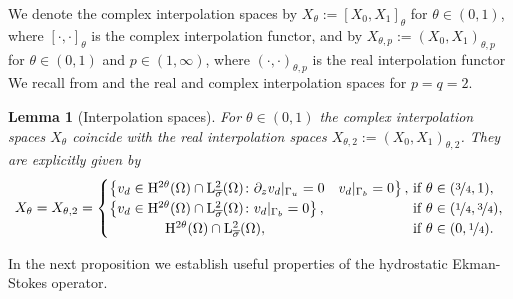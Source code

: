 \documentclass[preprint]{elsarticle}
\newtheorem{lem}[lem]{Lemma}
\numberwithin{equation}{section}
\newcommand {\T}	{\mathbb{T}}
\renewcommand{\H}{\mathrm{H}}
\newcommand{\sigmabar}{\bar{\sigma}}
\renewcommand{\bar}[1]{\overline{#1}}
\newcommand{\rL}{\mathrm{L}}
\newcommand{\rH}{\H}
\begin{document}
\smallskip 

We denote the complex interpolation spaces  by $X_\theta := [X_0,X_1]_\theta$ for $\theta \in (0,1)$, where $[\cdot,\cdot]_\theta$ is the complex interpolation functor, and by $X_{\theta,p} := (X_0,X_1)_{\theta,p}$ for $\theta \in (0,1)$ and $p \in (1,\infty)$, where $(\cdot,\cdot)_{\theta,p}$ is the real interpolation functor
We recall from \cite{HHK:16_2} and \cite{GGHHK:20_2} the real and complex interpolation spaces for $p = q = 2$. 

\begin{lem}[Interpolation spaces]\label{lem:interpolation spaces_2}
	For $\theta \in (0,1)$ the complex interpolation spaces $X_\theta$ coincide with the real interpolation spaces $X_{\theta,2} := (X_0,X_1)_{\theta,2}$. They are explicitly given by
	\begin{equation*}
		X_\theta = X_{\theta,2}
		=  
		\begin{cases}
			\left\{ v_d \in \rH^{2\theta}(\Omega) \cap \rL^2_{\sigmabar}(\Omega) \colon \partial_z v_d|_{\Gamma_u} = 0 \quad  v_d|_{\Gamma_b} = 0 \right\}, \hspace{-1 em}&\text{ if } \theta \in (\nicefrac{3}{4},1), \\
			\left\{ v_d \in \rH^{2\theta}(\Omega) \cap \rL^2_{\sigmabar}(\Omega) \colon v_d|_{\Gamma_b} = 0 \right\}, &\text{ if } \theta \in (\nicefrac{1}{4},\nicefrac{3}{4}), \\
			\qquad \qquad \rH^{2\theta}(\Omega) \cap \rL^2_{\sigmabar}(\Omega), 
			&\text{ if } \theta \in (0,\nicefrac{1}{4}).
		\end{cases}
	\end{equation*} 
\end{lem}

In the next proposition we establish useful properties of the hydrostatic Ekman-Stokes operator. 
\end{document}
